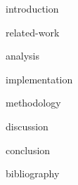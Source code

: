 \documentclass[cic,tc,english,nominata]{resources/documentclass/iiufrgs}
\begin{document}

\tableofcontents


{introduction}


{related-work}


{analysis}


{implementation}


{methodology}


{discussion}


{conclusion}


{bibliography}

\end{document}
